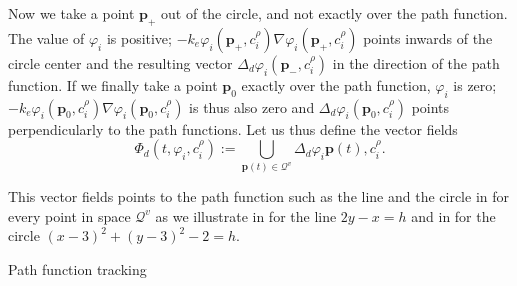 Now we take a point $\mathbf{p}_{+}$ out of the circle, and not exactly over the path function. The value of $\varphi_i$ is positive; $-k_e\varphi_i(\mathbf{p}_{+},c_i^\rho)\nabla\varphi_i(\mathbf{p}_{+},c_i^\rho)$ points inwards of the circle center and the resulting vector $\Delta_d\varphi_i(\mathbf{p}_{-},c_i^\rho)$ in the direction of the path function. If we finally take a point $\mathbf{p}_{0}$ exactly over the path function, $\varphi_i$ is zero; $-k_e\varphi_i(\mathbf{p}_{0},c_i^\rho)\nabla\varphi_i(\mathbf{p}_{0},c_i^\rho)$ is thus also zero and $\Delta_d\varphi_i(\mathbf{p}_{0},c_i^\rho)$ points perpendicularly to the path functions. Let us thus define the vector fields
\begin{equation}
  \varPhi_d(t,\varphi_i,c_i^\rho):=\bigcup\limits_{\mathbf{p}(t)\in\mathcal{Q}^v}{\Delta_d\varphi_i{\mathbf{p}(t),c_i^\rho}}.
\end{equation}

This vector fields points to the path function such as the line and the circle in  for every point in space $\mathcal{Q}^v$ as we illustrate in  for the line $2y-x=h$ and in  for the circle $(x-3)^2+(y-3)^2-2=h$.

\begin{algorithm}[h!] %

  \DontPrintSemicolon
  \vspace{.8ex}

  \vspace{.8ex}

  \caption{Path function tracking}
  \label{algo:track}
\end{algorithm}


